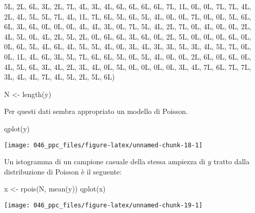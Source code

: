 \documentclass[
]{memoir}
\newenvironment{Shaded}{\begin{snugshade}}{\end{snugshade}}
\newcommand{\FunctionTok}[1]{\textcolor[rgb]{0.00,0.00,0.00}{#1}}
\newcommand{\NormalTok}[1]{#1}
\newcommand{\OtherTok}[1]{\textcolor[rgb]{0.56,0.35,0.01}{#1}}
\theoremstyle{definition}
\theoremstyle{definition}
\theoremstyle{definition}
\theoremstyle{definition}
\theoremstyle{remark}
\begin{document}
\begin{Shaded}
\begin{Highlighting}[]
\NormalTok{       5L, 2L, 6L, 3L, 2L, 7L, 4L, 3L, 4L, }
\NormalTok{       6L, 6L, 6L, 6L, 7L, 1L, 0L, 0L, 7L, }
\NormalTok{       7L, 4L, 2L, 4L, 5L, 5L, 7L, 4L, 1L, }
\NormalTok{       7L, 6L, 5L, 6L, 5L, 4L, 0L, 0L, 7L, }
\NormalTok{       0L, 0L, 5L, 6L, 6L, 3L, 6L, 0L, 0L, }
\NormalTok{       0L, 4L, 4L, 3L, 0L, 7L, 5L, 4L, 2L, }
\NormalTok{       7L, 0L, 4L, 0L, 0L, 2L, 4L, 5L, 0L, }
\NormalTok{       4L, 2L, 5L, 2L, 0L, 6L, 6L, 3L, 6L, }
\NormalTok{       0L, 2L, 5L, 0L, 0L, 0L, 6L, 0L, 0L, }
\NormalTok{       6L, 5L, 4L, 6L, 4L, 5L, 5L, 4L, 0L, }
\NormalTok{       3L, 4L, 3L, 3L, 5L, 3L, 4L, 5L, 7L, }
\NormalTok{       0L, 0L, 1L, 4L, 6L, 3L, 5L, 7L, 6L, }
\NormalTok{       6L, 5L, 0L, 5L, 4L, 0L, 0L, 2L, 6L, }
\NormalTok{       0L, 6L, 0L, 4L, 5L, 6L, 3L, 4L, 2L, }
\NormalTok{       3L, 4L, 0L, 5L, 0L, 0L, 0L, 0L, 3L, }
\NormalTok{       4L, 7L, 6L, 7L, 7L, 3L, 4L, 4L, 7L, }
\NormalTok{       4L, 5L, 2L, 5L, 6L)}

\NormalTok{N }\OtherTok{\textless{}{-}} \FunctionTok{length}\NormalTok{(y)}
\end{Highlighting}
\end{Shaded}

\noindent
Per questi dati sembra appropriato un modello di Poisson.

\begin{Shaded}
\begin{Highlighting}[]
\FunctionTok{qplot}\NormalTok{(y)}
\end{Highlighting}
\end{Shaded}

\begin{center}\texttt{[image: 046\_ppc\_files/figure-latex/unnamed-chunk-18-1]} \end{center}

\noindent
Un istogramma di un campione casuale della stessa ampiezza di \(y\) tratto dalla distribuzione di Poisson è il seguente:

\begin{Shaded}
\begin{Highlighting}[]
\NormalTok{x }\OtherTok{\textless{}{-}} \FunctionTok{rpois}\NormalTok{(N, }\FunctionTok{mean}\NormalTok{(y))}
\FunctionTok{qplot}\NormalTok{(x)}
\end{Highlighting}
\end{Shaded}

\begin{center}\texttt{[image: 046\_ppc\_files/figure-latex/unnamed-chunk-19-1]} \end{center}
\end{document}
